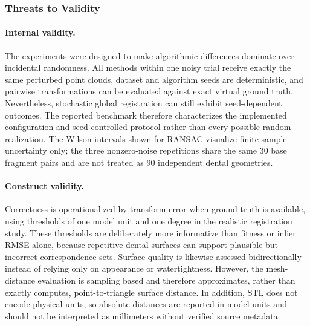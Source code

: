 \subsubsection{Threats to Validity}

\paragraph{Internal validity.}
The experiments were designed to make algorithmic differences dominate over incidental randomness. All methods within one noisy trial receive exactly the same perturbed point clouds, dataset and algorithm seeds are deterministic, and pairwise transformations can be evaluated against exact virtual ground truth. Nevertheless, stochastic global registration can still exhibit seed-dependent outcomes. The reported benchmark therefore characterizes the implemented configuration and seed-controlled protocol rather than every possible random realization. The Wilson intervals shown for RANSAC visualize finite-sample uncertainty only; the three nonzero-noise repetitions share the same 30 base fragment pairs and are not treated as 90 independent dental geometries.

\paragraph{Construct validity.}
Correctness is operationalized by transform error when ground truth is available, using thresholds of one model unit and one degree in the realistic registration study. These thresholds are deliberately more informative than fitness or inlier RMSE alone, because repetitive dental surfaces can support plausible but incorrect correspondence sets. Surface quality is likewise assessed bidirectionally instead of relying only on appearance or watertightness. However, the mesh-distance evaluation is sampling based and therefore approximates, rather than exactly computes, point-to-triangle surface distance. In addition, STL does not encode physical units, so absolute distances are reported in model units and should not be interpreted as millimeters without verified source metadata.


